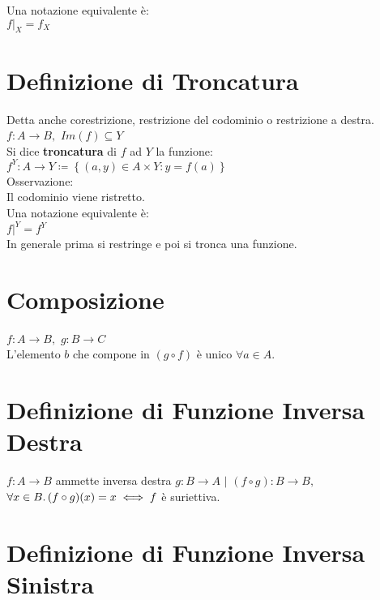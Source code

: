 \documentclass[a4paper, twoside, italian, 11pt]{book}
\newcommand{\braces}[1] {\left \{ #1 \right \}}
\begin{document}
\noindent
Una notazione equivalente è: \\

$f|_X = f_X$



\section{Definizione di Troncatura}

Detta anche corestrizione, restrizione del codominio o restrizione a destra. \\

\noindent
$f : A \rightarrow B,$ $Im(f) \subseteq Y$ \\

\noindent
Si dice \textbf{troncatura} di $f$ ad $Y$ la funzione: \\

$f^Y : A \rightarrow Y \coloneqq \braces{(a, y) \in A \times Y : y = f(a)}$ \\

\noindent
Osservazione: \\
Il codominio viene ristretto. \\

\noindent
Una notazione equivalente è: \\

$f|^Y = f^Y$ \\

\noindent
In generale prima si restringe e poi si tronca una funzione.



\section{Composizione}

$f : A \rightarrow B,$ $g : B \rightarrow C$ \\
\noindent
L'elemento $b$ che compone in $(g \circ f)$ è unico $\forall a \in A$.



\section{Definizione di Funzione Inversa Destra}

$f : A \rightarrow B$ ammette inversa destra $g : B \rightarrow A$ $|$ $(f \circ g) : B \rightarrow B,$ $\forall x \in B \ldotp (f \circ g)(x) = x \iff f$ è suriettiva.



\section{Definizione di Funzione Inversa Sinistra}
\end{document}
